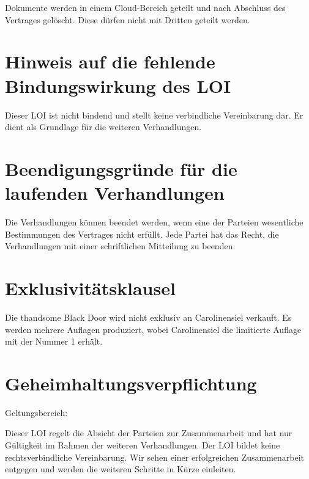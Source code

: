 Dokumente werden in einem Cloud-Bereich geteilt und nach Abschluss des Vertrages gelöscht.
Diese dürfen nicht mit Dritten geteilt werden. 

  
\section[short]{Hinweis auf die fehlende Bindungswirkung des LOI}
 
Dieser LOI ist nicht bindend und stellt keine verbindliche Vereinbarung dar. 
Er dient als Grundlage für die weiteren Verhandlungen. 

  
\section[short]{Beendigungsgründe für die laufenden Verhandlungen}

Die Verhandlungen können beendet werden, wenn eine der Parteien wesentliche Bestimmungen
des Vertrages nicht erfüllt. Jede Partei hat das Recht, die Verhandlungen mit einer schriftlichen Mitteilung zu beenden. 

  
\section[short]{Exklusivitätsklausel}
 
Die thandsome Black Door wird nicht exklusiv an Carolinensiel verkauft.
Es werden mehrere Auflagen produziert, wobei Carolinensiel die limitierte Auflage mit der Nummer 1 erhält. 

\section[short]{Geheimhaltungsverpflichtung}
Geltungsbereich: 

Dieser LOI regelt die Absicht der Parteien zur Zusammenarbeit und hat nur Gültigkeit im Rahmen der weiteren Verhandlungen. Der LOI bildet keine rechtsverbindliche Vereinbarung. 
Wir sehen einer erfolgreichen Zusammenarbeit entgegen und werden die weiteren Schritte in Kürze einleiten. 



\begin{flushleft}
    \makebox[.4\textwidth]{\hrulefill}\hfill    \makebox[.4\textwidth]{\hrulefill}\\
    \hfill
    \\
\end{flushleft}
